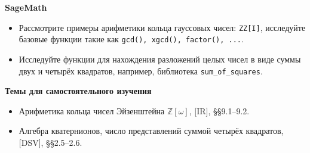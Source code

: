 \noindent\textbf{SageMath}
\begin{itemize}[topsep=0pt]
    \item Рассмотрите примеры арифметики кольца гауссовых чисел: \texttt{ZZ[I]}, исследуйте базовые функции такие как \texttt{gcd(), xgcd(), factor(), ...}.
    \item Исследуйте функции для нахождения разложений целых чисел в виде суммы двух и четырёх квадратов, например, библиотека \texttt{sum\_of\_squares}.
\end{itemize}

\noindent\textbf{Темы для самостоятельного изучения}
\begin{itemize}[topsep=0pt]
    \item Арифметика кольца чисел Эйзенштейна $\mathbb{Z}[\omega]$, [IR], \S\S 9.1--9.2.
    \item Алгебра кватернионов, число представлений суммой четырёх квадратов, [DSV], \S\S 2.5--2.6.
\end{itemize}